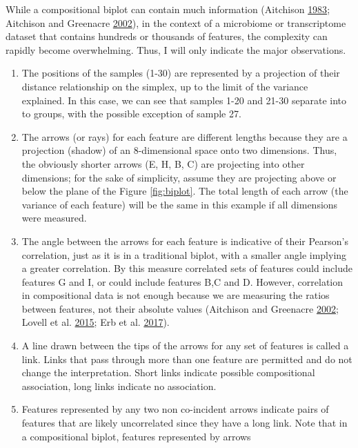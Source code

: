 \documentclass[onecolumn]{book}
\theoremstyle{definition}
\theoremstyle{definition}
\theoremstyle{definition}
\theoremstyle{remark}
\begin{document}
While a compositional biplot can contain much information (Aitchison
\protect\hyperlink{ref-Ait1983}{1983}; Aitchison and Greenacre
\protect\hyperlink{ref-aitchison2002biplots}{2002}), in the context of a
microbiome or transcriptome dataset that contains hundreds or thousands
of features, the complexity can rapidly become overwhelming. Thus, I
will only indicate the major observations.

\begin{enumerate}
\def\labelenumi{\arabic{enumi}.}
\item
  The positions of the samples (1-30) are represented by a projection of
  their distance relationship on the simplex, up to the limit of the
  variance explained. In this case, we can see that samples 1-20 and
  21-30 separate into to groups, with the possible exception of sample
  27.
\item
  The arrows (or rays) for each feature are different lengths because
  they are a projection (shadow) of an 8-dimensional space onto two
  dimensions. Thus, the obviously shorter arrows (E, H, B, C) are
  projecting into other dimensions; for the sake of simplicity, assume
  they are projecting above or below the plane of the Figure
  \ref{fig:biplot}. The total length of each arrow (the variance of each
  feature) will be the same in this example if all dimensions were
  measured.
\item
  The angle between the arrows for each feature is indicative of their
  Pearson's correlation, just as it is in a traditional biplot, with a
  smaller angle implying a greater correlation. By this measure
  correlated sets of features could include features G and I, or could
  include features B,C and D. However, correlation in compositional data
  is not enough because we are measuring the ratios between features,
  not their absolute values (Aitchison and Greenacre
  \protect\hyperlink{ref-aitchison2002biplots}{2002}; Lovell et al.
  \protect\hyperlink{ref-Lovell:2015}{2015}; Erb et al.
  \protect\hyperlink{ref-Erb134536}{2017}).
\item
  A line drawn between the tips of the arrows for any set of features is
  called a link. Links that pass through more than one feature are
  permitted and do not change the interpretation. Short links indicate
  possible compositional association, long links indicate no
  association.
\item
  Features represented by any two non co-incident arrows indicate pairs
  of features that are likely uncorrelated since they have a long link.
  Note that in a compositional biplot, features represented by arrows

\end{enumerate}
\end{document}
